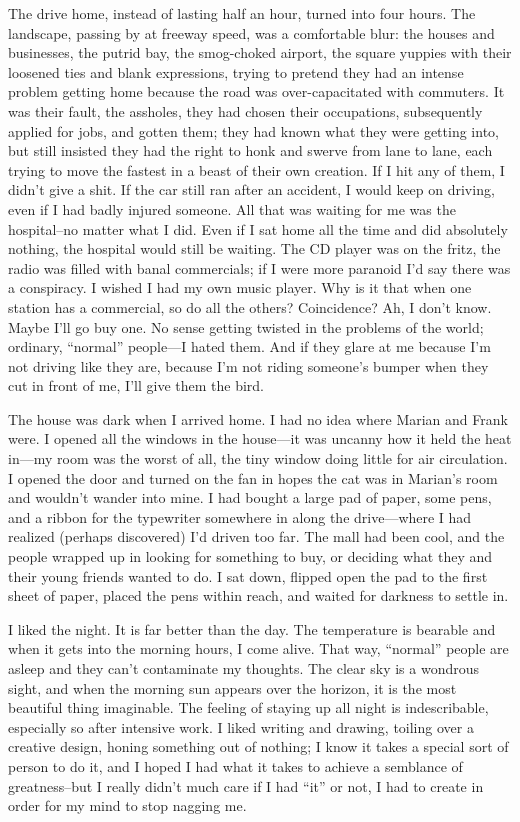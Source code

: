 \documentclass[
]{article}
\begin{document}
The drive home, instead of lasting half an hour, turned into four hours.
The landscape, passing by at freeway speed, was a comfortable blur: the
houses and businesses, the putrid bay, the smog-choked airport, the
square yuppies with their loosened ties and blank expressions, trying to
pretend they had an intense problem getting home because the road was
over-capacitated with commuters. It was their fault, the assholes, they
had chosen their occupations, subsequently applied for jobs, and gotten
them; they had known what they were getting into, but still insisted
they had the right to honk and swerve from lane to lane, each trying to
move the fastest in a beast of their own creation. If I hit any of them,
I didn't give a shit. If the car still ran after an accident, I would
keep on driving, even if I had badly injured someone. All that was
waiting for me was the hospital--no matter what I did. Even if I sat
home all the time and did absolutely nothing, the hospital would still
be waiting. The CD player was on the fritz, the radio was filled with
banal commercials; if I were more paranoid I'd say there was a
conspiracy. I wished I had my own music player. Why is it that when one
station has a commercial, so do all the others? Coincidence? Ah, I don't
know. Maybe I'll go buy one. No sense getting twisted in the problems of
the world; ordinary, ``normal'' people---I hated them. And if they glare
at me because I'm not driving like they are, because I'm not riding
someone's bumper when they cut in front of me, I'll give them the bird.

The house was dark when I arrived home. I had no idea where Marian and
Frank were. I opened all the windows in the house---it was uncanny how
it held the heat in---my room was the worst of all, the tiny window
doing little for air circulation. I opened the door and turned on the
fan in hopes the cat was in Marian's room and wouldn't wander into mine.
I had bought a large pad of paper, some pens, and a ribbon for the
typewriter somewhere in along the drive---where I had realized (perhaps
discovered) I'd driven too far. The mall had been cool, and the people
wrapped up in looking for something to buy, or deciding what they and
their young friends wanted to do. I sat down, flipped open the pad to
the first sheet of paper, placed the pens within reach, and waited for
darkness to settle in.

I liked the night. It is far better than the day. The temperature is
bearable and when it gets into the morning hours, I come alive. That
way, ``normal'' people are asleep and they can't contaminate my
thoughts. The clear sky is a wondrous sight, and when the morning sun
appears over the horizon, it is the most beautiful thing imaginable. The
feeling of staying up all night is indescribable, especially so after
intensive work. I liked writing and drawing, toiling over a creative
design, honing something out of nothing; I know it takes a special sort
of person to do it, and I hoped I had what it takes to achieve a
semblance of greatness--but I really didn't much care if I had ``it'' or
not, I had to create in order for my mind to stop nagging me.
\end{document}
